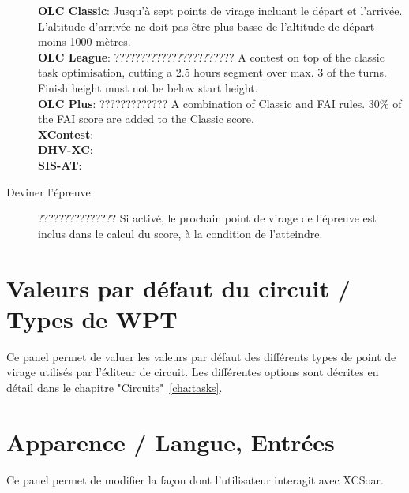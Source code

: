 \begin{description}
  {\bf OLC Classic}: Jusqu'à sept points de virage incluant le départ et l'arrivée. L'altitude d'arrivée ne doit pas être plus basse de l'altitude de départ moins 1000 mètres. \\
  {\bf OLC League}: ??????????????????????? A contest on top of the classic task optimisation, cutting
  a 2.5 hours segment over max. 3 of the turns. Finish height must not be below
  start height. \\
  {\bf OLC Plus}: ????????????? A combination of Classic and FAI rules. 30\% of the FAI score
  are added to the Classic score. \\
  {\bf XContest}:  \\
  {\bf DHV-XC}:  \\
  {\bf SIS-AT}:  \\
\item[Deviner l'épreuve] ??????????????? Si activé, le prochain point de virage de l'épreuve est inclus dans le calcul du score, à la condition de l'atteindre.
\end{description}

\section{Valeurs par défaut du circuit / Types de WPT}

Ce panel permet de valuer les valeurs par défaut des différents types de point de virage utilisés par l'éditeur de circuit. Les différentes options sont décrites en détail dans le chapitre  "Circuits"~\ref{cha:tasks}.

\section{Apparence / Langue, Entrées}\label{sec:interface}

Ce panel permet de modifier la façon dont l'utilisateur interagit avec XCSoar.

